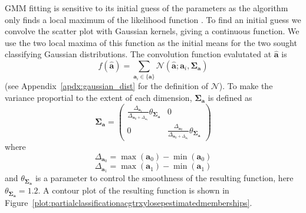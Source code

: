 GMM fitting is sensitive to its initial guess of the parameters as the algorithm
only finds a local maximum of the likelihood function
\cite[p.~187]{kay1993fundamentals}.
To find an initial guess we convolve the scatter plot with Gaussian kernels,
giving a continuous function. We use the two local maxima of this function as
the initial means for the two sought classifying Gaussian distributions. The
convolution function evalutated at $\boldsymbol{\hat{a}}$ is
\[
    f(\boldsymbol{\hat{a}}) = \sum_{\boldsymbol{a}_i \in \{\boldsymbol{a}\}}
    \mathcal{N} \left( \boldsymbol{\hat{a}} ; \boldsymbol{a}_i,
    \boldsymbol{\Sigma}_{\boldsymbol{a}} \right)
\]
(see
Appendix~\ref{apdx:gaussian_dist} for the definition of $\mathcal{N}$).
To make the variance proportial to the extent of each dimension,
$\boldsymbol{\Sigma}_{\boldsymbol{a}}$ is defined as
\[
    \boldsymbol{\Sigma}_{\boldsymbol{a}}
    =
    \begin{pmatrix}
        \frac{\Delta_{\boldsymbol{a}_1}}{\Delta_{\boldsymbol{a}_0
        +\Delta_{\boldsymbol{a}_1}}}
            \theta_{\boldsymbol{\Sigma_{\boldsymbol{a}}}}
        & 0 \\
        0 & \frac{\Delta_{\boldsymbol{a}_0}}{\Delta_{\boldsymbol{a}_0
    +\Delta_{\boldsymbol{a}_1}}}
            \theta_{\boldsymbol{\Sigma_{\boldsymbol{a}}}}
    \end{pmatrix}
\]
where
\[
    \Delta_{\boldsymbol{a}_0} = \max \left( \boldsymbol{a}_0 \right)
        - \min \left( \boldsymbol{a}_0 \right)
\]
\[
    \Delta_{\boldsymbol{a}_1} = \max \left( \boldsymbol{a}_1 \right)
        - \min \left( \boldsymbol{a}_1 \right)
\]
and $\theta_{\boldsymbol{\Sigma_{\boldsymbol{a}}}}$ is a parameter to control
the smoothness of the resulting function, here
$\theta_{\boldsymbol{\Sigma_{\boldsymbol{a}}}} = 1.2$. A contour plot of the
resulting function is shown in
Figure~\ref{plot:partialclassificationacgtrxylosepestimatedmemberships}.

